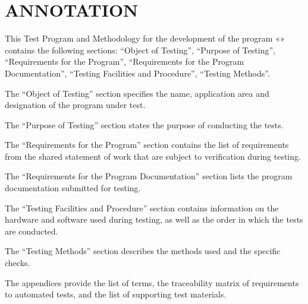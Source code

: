 \documentclass[12pt,a4paper]{extarticle}
\begin{document}
\sloppy





\section*{ANNOTATION}

This Test Program and Methodology for the development of the program «\hseProjectName» contains the following sections: \enquote{Object of Testing}, \enquote{Purpose of Testing}, \enquote{Requirements for the Program}, \enquote{Requirements for the Program Documentation}, \enquote{Testing Facilities and Procedure}, \enquote{Testing Methods}.

The \enquote{Object of Testing} section specifies the name, application area and designation of the program under test.

The \enquote{Purpose of Testing} section states the purpose of conducting the tests.

The \enquote{Requirements for the Program} section contains the list of requirements from the shared statement of work that are subject to verification during testing.

The \enquote{Requirements for the Program Documentation} section lists the program documentation submitted for testing.

The \enquote{Testing Facilities and Procedure} section contains information on the hardware and software used during testing, as well as the order in which the tests are conducted.

The \enquote{Testing Methods} section describes the methods used and the specific checks.

The appendices provide the list of terms, the traceability matrix of requirements to automated tests, and the list of supporting test materials.

\clearpage
\end{document}
